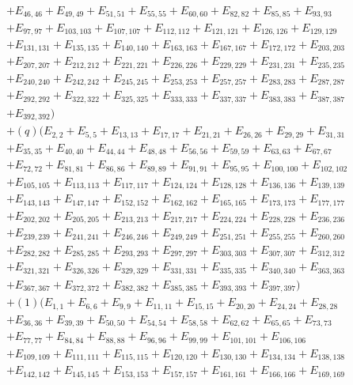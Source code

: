 \documentclass[pdftex]{sigma}
\numberwithin{equation}{section}
\theoremstyle{definition}
\begin{document}
\begin{align*}
&+E_{46,46}+E_{49,49}+E_{51,51}+E_{55,55}+E_{60,60}+E_{82,82}+E_{85,85}+E_{93,93}\\
&+E_{97,97}+E_{103,103}+E_{107,107}+E_{112,112}+E_{121,121}+E_{126,126}+E_{129,129}\\
&+E_{131,131}+E_{135,135}+E_{140,140}+E_{163,163}+E_{167,167}+E_{172,172}+E_{203,203}\\
&+E_{207,207}+E_{212,212}+E_{221,221}+E_{226,226}+E_{229,229}+E_{231,231}+E_{235,235}\\
&+E_{240,240}+E_{242,242}+E_{245,245}+E_{253,253}+E_{257,257}+E_{283,283}+E_{287,287}\\
&+E_{292,292}+E_{322,322}+E_{325,325}+E_{333,333}+E_{337,337}+E_{383,383}+E_{387,387}\\
&+E_{392,392})\\
&+(q)(E_{2,2}+E_{5,5}+E_{13,13}+E_{17,17}+E_{21,21}+E_{26,26}+E_{29,29}+E_{31,31}\\
&+E_{35,35}+E_{40,40}+E_{44,44}+E_{48,48}+E_{56,56}+E_{59,59}+E_{63,63}+E_{67,67}\\
&+E_{72,72}+E_{81,81}+E_{86,86}+E_{89,89}+E_{91,91}+E_{95,95}+E_{100,100}+E_{102,102}\\
&+E_{105,105}+E_{113,113}+E_{117,117}+E_{124,124}+E_{128,128}+E_{136,136}+E_{139,139}\\
&+E_{143,143}+E_{147,147}+E_{152,152}+E_{162,162}+E_{165,165}+E_{173,173}+E_{177,177}\\
&+E_{202,202}+E_{205,205}+E_{213,213}+E_{217,217}+E_{224,224}+E_{228,228}+E_{236,236}\\
&+E_{239,239}+E_{241,241}+E_{246,246}+E_{249,249}+E_{251,251}+E_{255,255}+E_{260,260}\\
&+E_{282,282}+E_{285,285}+E_{293,293}+E_{297,297}+E_{303,303}+E_{307,307}+E_{312,312}\\
&+E_{321,321}+E_{326,326}+E_{329,329}+E_{331,331}+E_{335,335}+E_{340,340}+E_{363,363}\\
&+E_{367,367}+E_{372,372}+E_{382,382}+E_{385,385}+E_{393,393}+E_{397,397})\\
&+(1)(E_{1,1}+E_{6,6}+E_{9,9}+E_{11,11}+E_{15,15}+E_{20,20}+E_{24,24}+E_{28,28}\\
&+E_{36,36}+E_{39,39}+E_{50,50}+E_{54,54}+E_{58,58}+E_{62,62}+E_{65,65}+E_{73,73}\\
&+E_{77,77}+E_{84,84}+E_{88,88}+E_{96,96}+E_{99,99}+E_{101,101}+E_{106,106}\\
&+E_{109,109}+E_{111,111}+E_{115,115}+E_{120,120}+E_{130,130}+E_{134,134}+E_{138,138}\\
&+E_{142,142}+E_{145,145}+E_{153,153}+E_{157,157}+E_{161,161}+E_{166,166}+E_{169,169}\\

\end{align*}
\end{document}
